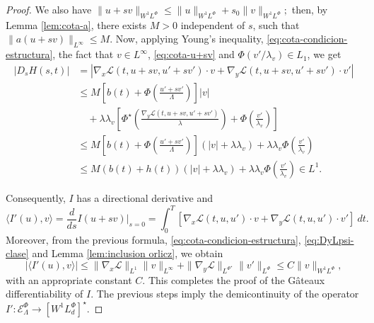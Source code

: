 \documentclass[twoside]{article}
\theoremstyle{remark}
\newcommand{\orlnor}{\|_{L^{\Phi}}}
\newcommand{\linf}{\|_{L^{\infty}}}
\newcommand{\lphi}{L^{\Phi}}
\newcommand{\lpsi}{L^{\Phi^{\star}}}
\newcommand{\wphi}{W^{1}\lphi}
\newcommand{\sobnor}{\|_{W^{1}\lphi}}
\newcommand{\domi}{\mathcal{E}^{\Phi}}
\renewcommand{\leq}{\leqslant}
\begin{document}
\begin{proof}
We also have
$
\|u+sv\sobnor\leq \|u\sobnor+s_0\|v\sobnor;
$
then, by Lemma \ref{lem:cota-a}, there exists $M>0$ independent of $s$, such that
$\|a(u+sv)\linf\leq M$. Now, applying Young's inequality,  \eqref{eq:cota-condicion-estructura},
the fact that $v \in L^{\infty}$, \eqref{eq:cota-u+sv} and $\Phi(v'/\lambda_v)\in L_1$, 
we get
\begin{equation}\label{ctg}
\begin{split}
|D_s H(s,t)|&=\left| \nabla_x\mathcal{L}(t,u+sv,u'+sv')\cdot v +
  \nabla_y\mathcal{L}(t, u+s v, u'+sv')\cdot v'\right| \\
  & \leq M \left[ b(t)+ \Phi\left(\frac{u'+sv'}{\Lambda}\right)\right]|v|\\
 &\quad+ \lambda\lambda_v\left[\Phi^{\star}\left(\frac{\nabla_y\mathcal{L}(t,u+sv,u'+sv')}{\lambda}\right)+\Phi\left(\frac{v'}{\lambda_v}\right) \right]
\\
 &\leq 
 M \left[ b(t)+ \Phi\left(\frac{u'+sv'}{\Lambda}\right)\right] \left(|v|+\lambda\lambda_v\right) +\lambda\lambda_v \Phi\left(\frac{v'}{\lambda_v}\right)\\
  &\leq 
 M \left( b(t)+h(t)\right) \left(|v|+\lambda\lambda_v\right)+\lambda\lambda_v \Phi\left(\frac{v'}{\lambda_v}\right)
 \in L^1.
\end{split}
\end{equation}

Consequently, $I$ has a directional derivative and
\[
\langle I'(u),v \rangle=\frac{d}{ds}I(u+s v)\big|_{s=0}=\int_0^T  
\left[\nabla_x\mathcal{L}(t,u,u')\cdot v+ \nabla_y\mathcal{L}(t,u,u')\cdot v'\right] \ dt.
\]
Moreover, from the previous formula, \eqref{eq:cota-condicion-estructura},  \eqref{eq:DyLpsi-clase} and
Lemma \ref{lem:inclusion orlicz}, we obtain
\[
|\langle I'(u),v \rangle| \leq \|\nabla_x\mathcal{L}\|_{L^1} \| v\linf + 
\|\nabla_y\mathcal{L}\|_{\lpsi} \|v'\orlnor \leq C \|v\sobnor,
\]
with an appropriate constant $C$.
This completes the proof of the G\^ateaux differentiability of $I$. 
The previous steps imply the demicontinuity of the operator $I':\domi_{\Lambda}  \to \left[\wphi_d
\right]^{\star} $.



\end{proof}
\end{document}
